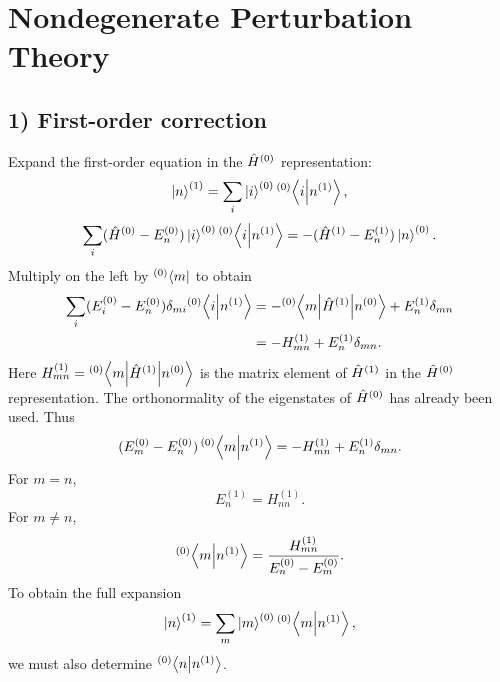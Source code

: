 \section{Nondegenerate Perturbation Theory}
\subsection*{1) First-order correction}
Expand the first-order equation in the $\hat{H}^{(0)}$ representation:
\begin{equation}
 \left|n\right\rangle^{(1)}=\sum_i\left|i\right\rangle^{(0)}{}^{(0)}\!\left\langle i\middle|n^{(1)}\right\rangle,
\end{equation}
\begin{equation}
 \sum_i(\hat{H}^{(0)}-E_n^{(0)})\left|i\right\rangle^{(0)}
 {}^{(0)}\!\left\langle i\middle|n^{(1)}\right\rangle
 =-(\hat{H}^{(1)}-E_n^{(1)})\left|n\right\rangle^{(0)}.
\end{equation}
Multiply on the left by ${}^{(0)}\!\left\langle m\right|$ to obtain
\begin{equation}\begin{aligned}
 \sum_i(E_i^{(0)}-E_n^{(0)})\delta_{mi}
 {}^{(0)}\!\left\langle i\middle|n^{(1)}\right\rangle
 &=-{}^{(0)}\!\left\langle m\middle|\hat{H}^{(1)}\middle|n^{(0)}\right\rangle+E_n^{(1)}\delta_{mn}\\
 &=-H_{mn}^{(1)}+E_n^{(1)}\delta_{mn}.
\end{aligned}\end{equation}
Here $H_{mn}^{(1)}={}^{(0)}\!\left\langle m\middle|\hat{H}^{(1)}\middle|n^{(0)}\right\rangle$ is the matrix element of $\hat{H}^{(1)}$ in the $\hat{H}^{(0)}$ representation. The orthonormality of the eigenstates of $\hat{H}^{(0)}$ has already been used. Thus
\begin{equation}
 (E_m^{(0)}-E_n^{(0)})\,{}^{(0)}\!\left\langle m\middle|n^{(1)}\right\rangle
 =-H_{mn}^{(1)}+E_n^{(1)}\delta_{mn}.
\end{equation}
For $m=n$,
\begin{equation}
 E_n^{(1)}=H_{nn}^{(1)}.
\end{equation}
For $m\ne n$,
\begin{equation}
 {}^{(0)}\!\left\langle m\middle|n^{(1)}\right\rangle=
 \frac{H_{mn}^{(1)}}{E_n^{(0)}-E_m^{(0)}}.
\end{equation}
To obtain the full expansion
\begin{equation}
 \left|n\right\rangle^{(1)}=\sum_m\left|m\right\rangle^{(0)}{}^{(0)}\!\left\langle m\middle|n^{(1)}\right\rangle,
\end{equation}
we must also determine ${}^{(0)}\!\left\langle n\middle|n^{(1)}\right\rangle$.

